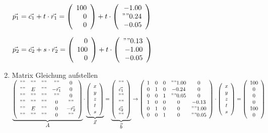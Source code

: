\begin{enumerate}
\begin{minipage}{0.5\textwidth}
		$\vec{p_1} = \vec{c_1}+t \cdot \vec{r_1}= \left(\begin{array}{r} 100 \\ 0 \\ 0 \\ \end{array}\right)+t\cdot \left(\begin{array}{r} -1.00 \\ " "0.24 \\ -0.05 \\ \end{array}\right)$
	\end{minipage}
	\begin{minipage}{0.5\textwidth}
		$\vec{p_2} = \vec{c_2}+s \cdot \vec{r_2}= \left(\begin{array}{r} 0 \\ 100 \\ 0 \\ \end{array}\right)+t\cdot \left(\begin{array}{r} " "0.13 \\ -1.00 \\ -0.05 \\ \end{array}\right)$
	\end{minipage}
	\item Matrix Gleichung aufstellen\\
		$\underbrace{\left(\begin{array}{ccccc}
			" "&" "&" "&" "& 0\\
			" "& E &" "&-\vec{r_1}&0\\
			" "&" "&" "&" "& 0\\
			" "&" "&" "& 0 & " "\\
			" "& E &" "& 0 &-\vec{r_2}\\
			" "&" "&" "& 0 & " "
		\end{array}\right)}_{\displaystyle A}\cdot
		\underbrace{\left(\begin{array}{c}
		x\\y\\z\\t\\s
		\end{array}\right)}_{\displaystyle\vec{x}} = 
		\underbrace{\left(\begin{array}{c}
		" "\\\vec{c_1}\\" "\\" "\\\vec{c_2}\\" "
		\end{array}\right)}_{\displaystyle\vec{b}} \rightarrow 
		\left(\begin{array}{ccccc}
			1 & 0 & 0 &" "1.00& 0\\
			0 & 1 & 0 &  -0.24& 0\\
			0 & 0 & 1 &" "0.05& 0\\
			1 & 0 & 0 & 0 &  -0.13\\
			0 & 1 & 0 & 0 &" "1.00\\
			0 & 0 & 1 & 0 &" "0.05
		\end{array}\right)\cdot
		\left(\begin{array}{c}
			x\\y\\z\\t\\s
		\end{array}\right) = 
		\left(\begin{array}{c}
			100\\0\\0\\0\\100\\0
		\end{array}\right)$
		

\end{enumerate}
